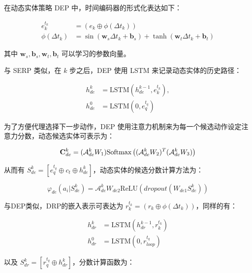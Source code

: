 \documentclass[a4paper, AutoFakeBold]{article}
\begin{document}
在动态实体策略 DEP 中，时间编码器的形式化表达如下：

\begin{equation}
	\begin{aligned}
e_k^{t_k} & =(e_k\oplus\phi(\Delta t_k)) \\ 
\phi(\Delta t_k) & =\sin({\boldsymbol w}_s\Delta t_k+{\boldsymbol b}_s)+\tanh({\boldsymbol w}_t\Delta t_k+{\boldsymbol b}_t)
	\end{aligned}
\end{equation}

其中 ${\boldsymbol w}_s,{\boldsymbol b}_s,{\boldsymbol w}_t,{\boldsymbol b}_t$ 可以学习的参数向量。

与 SERP 类似，在 $k$ 步之后，DEP 使用 LSTM 来记录动态实体的历史路径：

\begin{equation}
	\begin{aligned}
h^k_{de} & =\text{LSTM}(h_{de}^{k-1},e_k^{t_k}), \\ 
h^0_{de} & =\text{LSTM}(0,e_q^{t_q})
	\end{aligned}
\end{equation}

为了方便代理选择下一步动作，DEP 使用注意力机制来为每一个候选动作设定注意力分数，动态候选实体可表示为：

\begin{equation}
{\bold C}^k_{de}=({\mathcal A}^k_{de}W_1)\text{Softmax}\left(({\mathcal A}^k_{de}W_2)^T({\mathcal A}^k_{de}W_3)\right)
\end{equation}

从而有 $S_{de}^k=[e_q^{t_q}\oplus c_t \oplus h^k_{de}]$，动态实体的候选分数计算方法为：

\begin{equation}
\varphi_{de}(a_i|S^k_{de})={\mathcal A}_{de}^k W_{de2}\text{ReLU}(dropout(W_{de1}S^k_{de}))
\end{equation}

与DEP类似，DRP的嵌入表示可表达为 $r_k^{t_k}=(r_k\oplus\phi(\Delta t_k))$，同样的有：

\begin{equation}
	\begin{aligned}
h^k_{dr} & =\text{LSTM}(h_{dr}^{k-1},r_k^{t_k}) \\ 
h^0_{dr} & =\text{LSTM}(0,r_{loop}^{t_q})
	\end{aligned}
\end{equation}

以及 $S_{dr}^k=[r_q^{t_q}\oplus h^k_{dr}]$，分数计算函数为：
\end{document}
